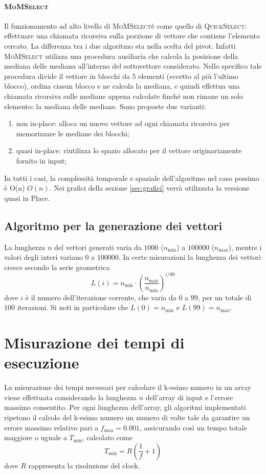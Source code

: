 \documentclass[a4paper]{article}
\newcommand{\QuickSelect}{\textsc{QuickSelect}}
\newcommand{\MoMSelect}{\textsc{MoMSelect}}
\newcommand{\Olin}{\ifmmode O(n) \else $O(n)$\fi} %
\begin{document}
\paragraph{\MoMSelect}
Il funzionamento ad alto livello di \MoMSelect è come quello di \QuickSelect: effettuare una chiamata ricorsiva sulla porzione di vettore che contiene l'elemento cercato.
La differenza tra i due algoritmo sta nella scelta del pivot.
Infatti \MoMSelect{} utilizza una procedura ausiliaria che calcola la posizione della mediana delle mediana all'interno del sottovettore considerato.
Nello specifico tale procedura divide il vettore in blocchi da $5$ elementi (eccetto al più l'ultimo blocco), ordina ciasun blocco e ne calcola la mediana, e quindi effettua una chiamata ricorsiva sulle mediane appena calcolate finché non rimane un solo elemento: la mediana delle mediane.
Sono proposte due varianti:
\begin{enumerate}
    \item non in-place: alloca un nuovo vettore ad ogni chiamata ricorsiva per memorizzare le mediane dei blocchi;
    \item quasi in-place: riutilizza lo spazio allocato per il vettore originariamente fornito in input;
\end{enumerate}

In tutti i casi, la complessità temporale e spaziale dell'algoritmo nel caso pessimo è \Olin. 
Nei grafici della sezione \ref{sec:grafici} verrà utilizzata la versione quasi in Place.

\subsection{Algoritmo per la generazione dei vettori}
La lunghezza $n$ del vettori generati varia da $1000$ ($n_{\min}$) a $100000$ ($n_{\max}$), mentre i valori degli interi variano $0$ a $100000$.
In certe misurazioni la lunghezza dei vettori cresce secondo la serie geometrica
\[
    L(i) = n_{\min} \cdot \left(\frac{n_{\max}}{n_{\min}}\right)^{i/99}
\]
dove $i$ è il numero dell'iterazione corrente, che varia da $0$ a $99$, per un totale di $100$ iterazioni.
Si noti in particolare che $L(0) = n_{\min}$ e $L(99) = n_{\max}$.


\section{Misurazione dei tempi di esecuzione}
\label{sec:misurazione}
La misurazione dei tempi necessari per calcolare il k-esimo numero in un array viene effettuata considerando la lunghezza \( n \) dell'array di input e l'errore massimo consentito. Per ogni lunghezza dell'array, gli algoritmi implementati ripetono il calcolo del k-esimo numero un numero di volte tale da garantire un errore massimo relativo pari a \( f_{\max} = 0.001 \), assicurando così un tempo totale maggiore o uguale a \( T_{\min} \), calcolato come \[ T_{\min} = R \left( \frac{1}{f} + 1 \right) \] dove \( R \) rappresenta la risoluzione del clock.
\end{document}
